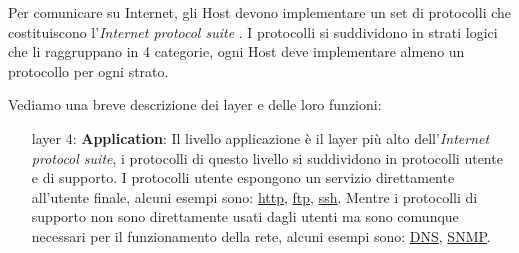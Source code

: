 Per comunicare su Internet, gli Host devono implementare un set di protocolli che costituiscono l'\textit{Internet protocol suite} \cite{RFC_1122}. I protocolli si suddividono in strati logici che li raggruppano in 4 categorie, ogni Host deve implementare almeno un protocollo per ogni strato.



Vediamo una breve descrizione dei layer e delle loro funzioni:

\begin{enumerate} %
    \item[layer 4:] \textbf{Application}: Il livello applicazione è il layer pi\`u alto dell'\textit{Internet protocol suite}, i protocolli di questo livello si suddividono in protocolli utente e di supporto. \newline
        I protocolli utente espongono un servizio direttamente all'utente finale, alcuni esempi sono: \href{https://en.wikipedia.org/wiki/Hypertext_Transfer_Protocol}{http}, \href{https://en.wikipedia.org/wiki/File_Transfer_Protocol}{ftp}, \href{https://en.wikipedia.org/wiki/Secure_Shell}{ssh}. Mentre i protocolli di supporto non sono direttamente usati dagli utenti ma sono comunque necessari per il funzionamento della rete, alcuni esempi sono: \href{https://en.wikipedia.org/wiki/Domain_Name_System}{DNS}, \href{https://en.wikipedia.org/wiki/Simple_Network_Management_Protocol}{SNMP}.

\end{enumerate}
